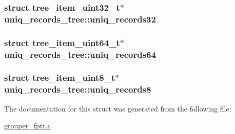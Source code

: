 \hypertarget{structuniq__records__tree_a5804158857fe19cae48836378cc109f7}{
\subsubsection[{uniq\-\_\-records32}]{\setlength{\rightskip}{0pt plus 5cm}struct tree\-\_\-item\-\_\-uint32\-\_\-t$\ast$ {\bf uniq\-\_\-records\-\_\-tree\-::uniq\-\_\-records32}}}\label{structuniq__records__tree_a5804158857fe19cae48836378cc109f7}
\hypertarget{structuniq__records__tree_a6fda0a82a4841a0d9df656535dd0a431}{
\subsubsection[{uniq\-\_\-records64}]{\setlength{\rightskip}{0pt plus 5cm}struct tree\-\_\-item\-\_\-uint64\-\_\-t$\ast$ {\bf uniq\-\_\-records\-\_\-tree\-::uniq\-\_\-records64}}}\label{structuniq__records__tree_a6fda0a82a4841a0d9df656535dd0a431}
\hypertarget{structuniq__records__tree_a62c665f69f3c41cf61d0fb3164bf6bb8}{
\subsubsection[{uniq\-\_\-records8}]{\setlength{\rightskip}{0pt plus 5cm}struct tree\-\_\-item\-\_\-uint8\-\_\-t$\ast$ {\bf uniq\-\_\-records\-\_\-tree\-::uniq\-\_\-records8}}}\label{structuniq__records__tree_a62c665f69f3c41cf61d0fb3164bf6bb8}


\-The documentation for this struct was generated from the following file\-:\begin{DoxyCompactItemize}
\item 
\hyperlink{grouper__fptr_8c}{grouper\-\_\-fptr.\-c}\end{DoxyCompactItemize}
